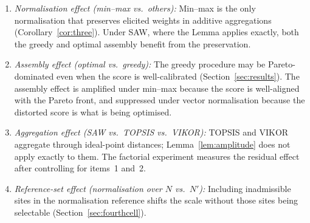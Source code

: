\begin{enumerate}
  \item \emph{Normalisation effect (min--max vs.\ others):}
    Min--max is the only normalisation that preserves elicited weights
    in additive aggregations (Corollary~\ref{cor:three}).
    Under SAW, where the Lemma applies exactly, both the greedy and
    optimal assembly benefit from the preservation.
  \item \emph{Assembly effect (optimal vs.\ greedy):}
    The greedy procedure may be Pareto-dominated even when the score
    is well-calibrated (Section~\ref{sec:results}).
    The assembly effect is amplified under min--max because the score
    is well-aligned with the Pareto front, and suppressed under vector
    normalisation because the distorted score is what is being
    optimised.
  \item \emph{Aggregation effect (SAW vs.\ TOPSIS vs.\ VIKOR):}
    TOPSIS and VIKOR aggregate through ideal-point distances;
    Lemma~\ref{lem:amplitude} does not apply exactly to them.
    The factorial experiment measures the residual effect after
    controlling for items~1 and~2.
  \item \emph{Reference-set effect (normalisation over $N$ vs.\ $N'$):}
    Including inadmissible sites in the normalisation reference shifts
    the scale without those sites being selectable
    (Section~\ref{sec:fourthcell}).
\end{enumerate}
